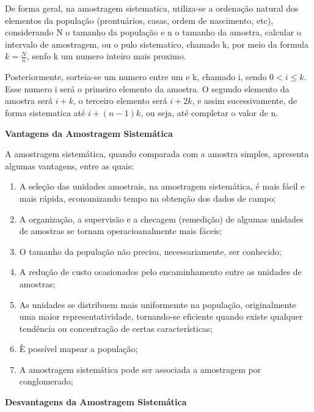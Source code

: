 De forma geral, na amostragem sistematica, utiliza-se a ordenação
natural dos elementos da população (prontuários, casas, ordem de
nascimento, etc), considerando N o tamanho da população e n o
tamanho da amostra, calcular o intervalo de amostragem, ou o pulo
sistematico, chamado k, por meio da formula $k=\frac{N}{n}$, senfo
k um numero inteiro mais proximo.\vskip0.3cm

Posteriormente, sorteia-se um numero entre um e k, chamado i,
sendo $0 < i \leq k$. Esse numero i será o primeiro elemento da
amostra. O segundo elemento da amostra será $i+k$, o terceiro
elemento será $i+2k$, e assim sucessivamente, de forma sistematica
até $i+(n-1)k$, ou seja, até completar o valor de n.
\vskip0.3cm


\textbf{Vantagens da Amostragem Sistemática}
\vskip0.3cm

A amostragem sistemática, quando comparada com a amostra simples, apresenta algumas vantagens, entre as quais:

\begin{enumerate}
  \item[{a)}] A seleção das unidades amostrais, na amostragem sistemática, é mais fácil e mais rápida, economizando tempo na obtenção dos dados de campo;
  \item[{b)}] A organização, a supervisão e a checagem (remedição) de algumas unidades de amostras se tornam operacioanalmente mais fáceis;
  \item[{c)}] O tamanho da população não precisa, necessariamente, ser conhecido;
  \item[{d)}] A redução de custo ocasionados pelo encaminhamento entre as unidades de amostras;
  \item[{e)}] As unidades se distribuem mais uniformemte na população, originalmente uma maior representatividade, tornando-se eficiente quando existe qualquer tendência ou concentração de certas características;
  \item[{f)}] È possível mapear a população;
  \item[{g)}] A amostragem sistemática pode ser associada  a amostragem por conglomerado;
\end{enumerate}

\textbf{Desvantagens da Amostragem Sistemática}
\vskip0.3cm

